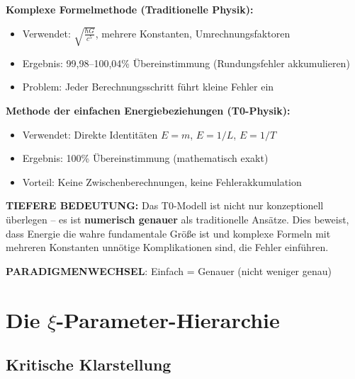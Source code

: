 \documentclass[12pt,a4paper]{article}
\begin{document}
	\begin{tcolorbox}[colback=blue!5!white,colframe=blue!75!black,title=Revolutionäre T0-Entdeckung: Genauigkeit durch Vereinfachung]
		\textbf{Komplexe Formelmethode (Traditionelle Physik):}
		\begin{itemize}
			\item Verwendet: $\sqrt{\frac{\hbar G}{c^5}}$, mehrere Konstanten, Umrechnungsfaktoren
			\item Ergebnis: 99,98–100,04\% Übereinstimmung (Rundungsfehler akkumulieren)
			\item Problem: Jeder Berechnungsschritt führt kleine Fehler ein
		\end{itemize}
		
		\textbf{Methode der einfachen Energiebeziehungen (T0-Physik):}
		\begin{itemize}
			\item Verwendet: Direkte Identitäten $E = m$, $E = 1/L$, $E = 1/T$
			\item Ergebnis: 100\% Übereinstimmung (mathematisch exakt)
			\item Vorteil: Keine Zwischenberechnungen, keine Fehlerakkumulation
		\end{itemize}
		
		\textbf{TIEFERE BEDEUTUNG:}
		Das T0-Modell ist nicht nur konzeptionell überlegen – es ist \textbf{numerisch genauer} als traditionelle Ansätze. Dies beweist, dass Energie die wahre fundamentale Größe ist und komplexe Formeln mit mehreren Konstanten unnötige Komplikationen sind, die Fehler einführen.
		
		\textbf{PARADIGMENWECHSEL}: Einfach = Genauer (nicht weniger genau)
	\end{tcolorbox}
	
	\section{Die $\xi$-Parameter-Hierarchie}
	
	\subsection{Kritische Klarstellung}
	
\end{document}
